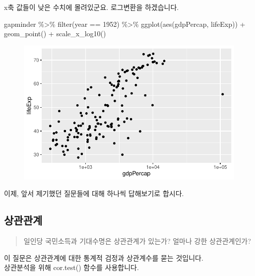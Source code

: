 \documentclass[
  letterpaper,
  DIV=11,
  numbers=noendperiod]{scrartcl}
\newenvironment{Shaded}{\begin{snugshade}}{\end{snugshade}}
\newcommand{\DecValTok}[1]{\textcolor[rgb]{0.68,0.00,0.00}{#1}}
\newcommand{\FunctionTok}[1]{\textcolor[rgb]{0.28,0.35,0.67}{#1}}
\newcommand{\NormalTok}[1]{\textcolor[rgb]{0.00,0.23,0.31}{#1}}
\newcommand{\SpecialCharTok}[1]{\textcolor[rgb]{0.37,0.37,0.37}{#1}}
\begin{document}
x축 값들이 낮은 수치에 몰려있군요. 로그변환을 하겠습니다.

\begin{Shaded}
\begin{Highlighting}[]
\NormalTok{gapminder }\SpecialCharTok{\%\textgreater{}\%}
  \FunctionTok{filter}\NormalTok{(year }\SpecialCharTok{==} \DecValTok{1952}\NormalTok{) }\SpecialCharTok{\%\textgreater{}\%}
  \FunctionTok{ggplot}\NormalTok{(}\FunctionTok{aes}\NormalTok{(gdpPercap, lifeExp)) }\SpecialCharTok{+} 
  \FunctionTok{geom\_point}\NormalTok{() }\SpecialCharTok{+} 
  \FunctionTok{scale\_x\_log10}\NormalTok{()}
\end{Highlighting}
\end{Shaded}

\begin{figure}[H]

{\centering \includegraphics{LinearRegression_files/figure-pdf/unnamed-chunk-3-1.pdf}

}

\end{figure}

이제, 앞서 제기했던 질문들에 대해 하나씩 답해보기로 합시다.

\hypertarget{uxc0c1uxad00uxad00uxacc4}{%
\subsection{상관관계}\label{uxc0c1uxad00uxad00uxacc4}}

\begin{quote}
일인당 국민소득과 기대수명은 상관관계가 있는가? 얼마나 강한
상관관계인가?
\end{quote}

이 질문은 상관관계에 대한 통계적 검정과 상관계수를 묻는 것입니다.\\
상관분석을 위해 cor.test() 함수를 사용합니다.
\end{document}

